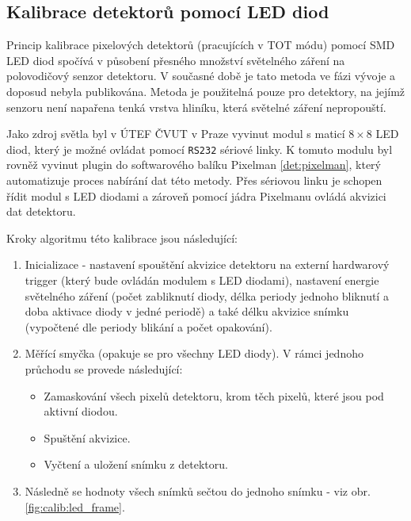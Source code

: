 \subsection{Kalibrace detektorů pomocí LED diod}\label{calib:led}
Princip kalibrace pixelových detektorů (pracujících v TOT módu) pomocí SMD LED diod spočívá v působení přesného množství světelného záření na polovodičový senzor detektoru. V současné době je tato metoda ve fázi vývoje a doposud nebyla publikována. Metoda je použitelná pouze pro detektory, na jejímž senzoru není napařena tenká vrstva hliníku, která světelné záření nepropouští. 

Jako zdroj světla byl v ÚTEF ČVUT v Praze vyvinut modul s maticí $8\times8$ LED diod, který je možné ovládat pomocí \texttt{RS232} sériové linky. K tomuto modulu byl rovněž vyvinut plugin do softwarového balíku Pixelman \ref{det:pixelman}, který automatizuje proces nabírání dat této metody. Přes sériovou linku je schopen řídit modul s LED diodami a zároveň pomocí jádra Pixelmanu ovládá akvizici dat detektoru.

Kroky algoritmu této kalibrace jsou následující:
\begin{enumerate}
	\item Inicializace - nastavení spouštění akvizice detektoru na externí hardwarový trigger (který bude ovládán modulem s LED diodami), nastavení energie světelného záření (počet zabliknutí diody, délka periody jednoho bliknutí a doba aktivace diody v jedné periodě) a také délku akvizice snímku (vypočtené dle periody blikání a počet opakování).
	\item Měřící smyčka (opakuje se pro všechny LED diody). V rámci jednoho průchodu se provede následující:
		\begin{itemize}
			\item Zamaskování všech pixelů detektoru, krom těch pixelů, které jsou pod aktivní diodou.
			\item Spuštění akvizice.
			\item Vyčtení a uložení snímku z detektoru.
		\end{itemize}
	\item Následně se hodnoty všech snímků sečtou do jednoho snímku - viz obr. \ref{fig:calib:led_frame}.
\end{enumerate}

